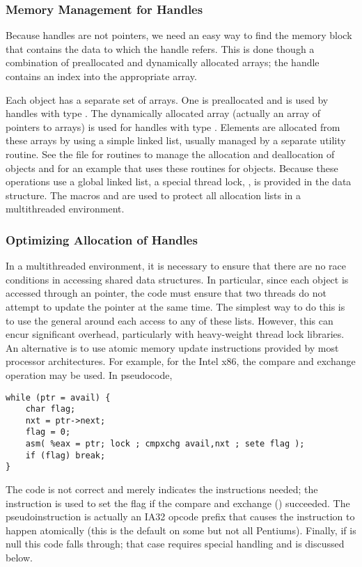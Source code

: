 \documentclass{article}
\begin{document}
\subsubsection{Memory Management for Handles}
\label{sec:handle-mem-mng}
Because handles are not pointers, we need an easy way to find the
memory block that contains the data to which the handle refers.  
This is done though a combination of preallocated and dynamically
allocated arrays; the handle contains an index into the appropriate
array.  

Each object has a separate set of arrays.  One is preallocated and is
used by handles with type .  The dynamically
allocated array 
(actually an array of pointers to arrays) is used for handles with
type .  Elements are allocated from these
arrays by using a simple linked list, usually managed by a separate
utility routine.  See the file  for routines to
manage the allocation and deallocation of objects and
 for an example that uses these routines for
 objects.
Because these operations use a global linked list, a special thread
lock, , is provided in the 
data structure.  The macros  and
 are used to protect all allocation
lists in a multithreaded environment.

\subsubsection{Optimizing Allocation of Handles}
In a multithreaded environment, it is necessary to ensure that there are no
race conditions in accessing shared data structures.  In particular, since
each object is accessed through an  pointer, the code must ensure
that two threads do not attempt to update the  pointer at the same
time.  The simplest way to do this is to use the general
 around each access to any of these
lists.  However, this can encur significant overhead, particularly with
heavy-weight thread lock libraries.  An alternative is to use atomic memory
update instructions provided by most processor architectures.  For example,
for the Intel x86, the compare and exchange operation may be used.  In
pseudocode, 
\begin{verbatim}
while (ptr = avail) {
    char flag;
    nxt = ptr->next; 
    flag = 0;
    asm( %eax = ptr; lock ; cmpxchg avail,nxt ; sete flag );
    if (flag) break;
}
\end{verbatim}
The  code is not correct and merely indicates the instructions
needed; the  instruction is used to set the flag if the compare and
exchange () succeeded.  The pseudoinstruction  is
actually an IA32 opcode prefix that causes the 
instruction to happen 
atomically (this is the default on some but not all Pentiums).  Finally,
if  is null this code falls through; that case requires special
handling and is discussed below.
\end{document}
